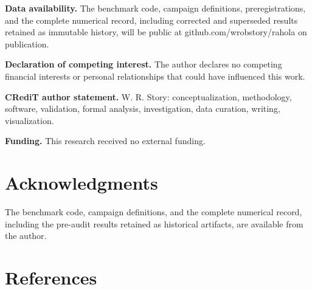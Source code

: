 \documentclass[11pt]{article}
\begin{document}
\textbf{Data availability.} The benchmark code, campaign definitions, preregistrations, and the
complete numerical record, including corrected and superseded results retained as immutable
history, will be public at github.com/wrobstory/rahola on publication.

\textbf{Declaration of competing interest.} The author declares no competing financial interests or
personal relationships that could have influenced this work.

\textbf{CRediT author statement.} W. R. Story: conceptualization, methodology, software,
validation, formal analysis, investigation, data curation, writing, visualization.

\textbf{Funding.} This research received no external funding.

\section*{Acknowledgments}

The benchmark code, campaign definitions, and the complete numerical record, including the
pre-audit results retained as historical artifacts, are available from the author.

\section*{References}
\end{document}
